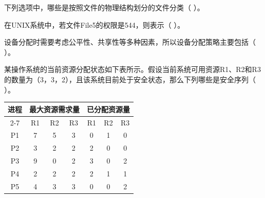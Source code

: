 \begin{qitems}[startnum=31]
\begin{bbox}
\qitem 下列选项中，哪些是按照文件的物理结构划分的文件分类（ ）。\par
{}
\end{bbox}

\begin{bbox}
\qitem 在UNIX系统中，若文件File5的权限是544，则表示（ ）。\par
{}
\end{bbox}

\begin{bbox}
\qitem 设备分配时需要考虑公平性、共享性等多种因素，所以设备分配策略主要包括（ ）。\par
{}
\end{bbox}

\begin{bbox}
\qitem 某操作系统的当前资源分配状态如下表所示。假设当前系统可用资源R1、R2和R3的数量为（3，3，2），且该系统目前处于安全状态，那么下列哪些是安全序列（ ）。\par
\begin{center}\small\setlength{\tabcolsep}{4pt}
\begin{tabular}{|c|ccc|ccc|}\hline
进程 & \multicolumn{3}{c|}{最大资源需求量} & \multicolumn{3}{c|}{已分配资源量} \\ \cline{2-7}
 & R1 & R2 & R3 & R1 & R2 & R3 \\ \hline
P1 & 7 & 5 & 3 & 0 & 1 & 0 \\ \hline
P2 & 3 & 2 & 2 & 2 & 0 & 0 \\ \hline
P3 & 9 & 0 & 2 & 3 & 0 & 2 \\ \hline
P4 & 2 & 2 & 2 & 2 & 1 & 1 \\ \hline
P5 & 4 & 3 & 3 & 0 & 0 & 2 \\ \hline
\end{tabular}\end{center}
\end{bbox}

\end{qitems}

